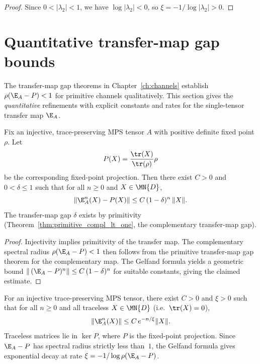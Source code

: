 \begin{proof}
    \leanok
    Since $0 < |\lambda_2| < 1$, we have $\log|\lambda_2| < 0$, so
    $\xi = -1/\log|\lambda_2| > 0$.
\end{proof}

\section{Quantitative transfer-map gap bounds}

The transfer-map gap theorems in Chapter~\ref{ch:channels} establish
$\rho(\E_A - P) < 1$ for primitive channels qualitatively. This section
gives the \emph{quantitative} refinements with explicit constants
and rates for the single-tensor transfer map $\E_A$.

\begin{theorem}%
    \label{thm:exponential_convergence_primitive}
    \leanok
    Fix an injective, trace-preserving MPS tensor $A$ with positive
    definite fixed point $\rho$.
    Let
    \[
        P(X) = \frac{\tr(X)}{\tr(\rho)}\rho
    \]
    be the corresponding fixed-point projection.
    Then there exist $C > 0$ and $0 < \delta \le 1$ such that for all
    $n \ge 0$ and $X \in \MN{D}$,
    \[
        \|\E_A^n(X) - P(X)\|
        \le  C\,(1-\delta)^n\,\|X\|.
    \]
    The transfer-map gap $\delta$ exists by primitivity
    (Theorem~\ref{thm:primitive_compl_lt_one}, the complementary transfer-map gap).
\end{theorem}

\begin{proof}
    \leanok
    Injectivity implies primitivity of the transfer map.
    The complementary spectral radius $\rho(\E_A - P) < 1$ then follows from
    the primitive transfer-map gap theorem for the complementary map.
    The Gelfand formula yields a
    geometric bound $\|\,(\E_A - P)^n\| \le C\,(1-\delta)^n$ for suitable
    constants, giving the claimed estimate.
\end{proof}

\begin{theorem}\label{thm:correlation_length_bound}
    \leanok
    For an injective trace-preserving MPS tensor, there exist
    $C > 0$ and $\xi > 0$ such that for all $n \ge 0$ and all
    traceless $X \in \MN{D}$ (i.e.\ $\tr(X) = 0$),
    \[
        \|\E_A^n(X)\|
        \le  C\,e^{-n/\xi} \|X\|.
    \]
    Traceless matrices lie in $\ker P$, where $P$ is the fixed-point
    projection. Since $\E_A - P$ has spectral radius strictly less
    than~$1$, the Gelfand formula gives exponential decay at rate
    $\xi = -1/\log\rho(\E_A - P)$.
\end{theorem}

